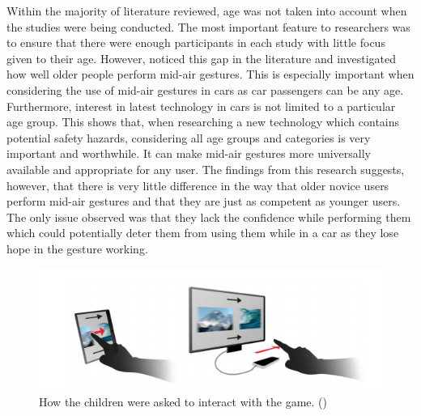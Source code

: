 \documentclass{l4proj}
\begin{document}
Within the majority of literature reviewed, age was not taken into account when the studies were being conducted. The most important feature to researchers was to ensure that there were enough participants in each study with little focus given to their age. However, \cite{Cabreira_Hwang_2016} noticed this gap in the literature and investigated how well older people perform mid-air gestures. This is especially important when considering the use of mid-air gestures in cars as car passengers can be any age. Furthermore, interest in latest technology in cars is not limited to a particular age group. This shows that, when researching a new technology which contains potential safety hazards, considering all age groups and categories is very important and worthwhile. It can make mid-air gestures more universally available and appropriate for any user. The findings from this research suggests, however, that there is very little difference in the way that older novice users perform mid-air gestures and that they are just as competent as younger users. The only issue observed was that they lack the confidence while performing them which could potentially deter them from using them while in a car as they lose hope in the gesture working. 

\begin{figure}[!htb]
    \centering
    \includegraphics[scale = 0.6]{images/gameGestures.png}
    \caption{How the children were asked to interact with the game. (\cite{Moser_Tscheligi_2015})}
    \label{fig:gameGestures}
\end{figure}
\end{document}
